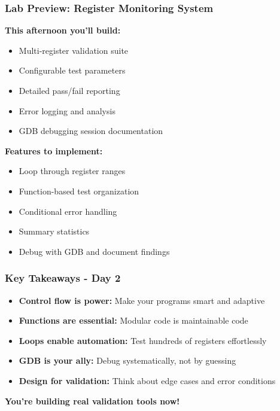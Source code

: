 \documentclass{beamer}
\begin{document}
\begin{frame}
\frametitle{Lab Preview: Register Monitoring System}
\textbf{This afternoon you'll build:}
\begin{itemize}
    \item Multi-register validation suite
    \item Configurable test parameters
    \item Detailed pass/fail reporting
    \item Error logging and analysis
    \item GDB debugging session documentation
\end{itemize}

\vspace{0.5cm}
\textbf{Features to implement:}
\begin{itemize}
    \item Loop through register ranges
    \item Function-based test organization
    \item Conditional error handling
    \item Summary statistics
    \item Debug with GDB and document findings
\end{itemize}
\end{frame}

\begin{frame}
\frametitle{Key Takeaways - Day 2}
\begin{itemize}
    \item \textbf{Control flow is power:} Make your programs smart and adaptive
    \item \textbf{Functions are essential:} Modular code is maintainable code
    \item \textbf{Loops enable automation:} Test hundreds of registers effortlessly
    \item \textbf{GDB is your ally:} Debug systematically, not by guessing
    \item \textbf{Design for validation:} Think about edge cases and error conditions
\end{itemize}

\vspace{0.5cm}
\begin{center}
\textbf{You're building real validation tools now!}
\end{center}
\end{frame}
\end{document}
